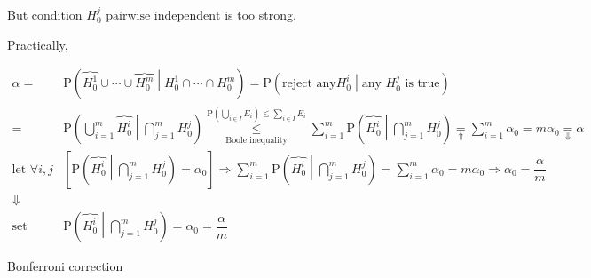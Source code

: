 \documentclass[
]{book}
\theoremstyle{definition}
\theoremstyle{definition}
\theoremstyle{definition}
\theoremstyle{definition}
\theoremstyle{remark}
\begin{document}
But condition \(H_{{\scriptscriptstyle 0}}^{{\scriptscriptstyle j}}\text{ pairwise independent}\) is too strong.

Practically,

\[
\begin{aligned}
\alpha= & \mathrm{P}\left(\overbrace{H_{{\scriptscriptstyle 0}}^{{\scriptscriptstyle 1}}}\cup\cdots\cup\overbrace{H_{{\scriptscriptstyle 0}}^{{\scriptscriptstyle m}}}\middle|H_{{\scriptscriptstyle 0}}^{{\scriptscriptstyle 1}}\cap\cdots\cap H_{{\scriptscriptstyle 0}}^{{\scriptscriptstyle m}}\right)=\mathrm{P}\left(\text{reject any}H_{{\scriptscriptstyle 0}}^{{\scriptscriptstyle i}}\middle|\text{any }H_{{\scriptscriptstyle 0}}^{{\scriptscriptstyle j}}\text{ is true}\right)\\
= & \mathrm{P}\left(\bigcup\limits _{i=1}^{m}\overbrace{H_{{\scriptscriptstyle 0}}^{{\scriptscriptstyle i}}}\middle|\bigcap\limits _{j=1}^{m}H_{{\scriptscriptstyle 0}}^{{\scriptscriptstyle j}}\right)\overset{\mathrm{P}\left(\bigcup\limits _{i\in I}E_{{\scriptscriptstyle i}}\right)\le\sum\limits _{i\in I}E_{{\scriptscriptstyle i}}}{\underset{\text{Boole inequality}}{\le}}\sum\limits _{i=1}^{m}\mathrm{P}\left(\overbrace{H_{{\scriptscriptstyle 0}}^{{\scriptscriptstyle i}}}\middle|\bigcap\limits _{j=1}^{m}H_{{\scriptscriptstyle 0}}^{{\scriptscriptstyle j}}\right)\underset{\Uparrow}{=}\sum\limits _{i=1}^{m}\alpha_{{\scriptscriptstyle 0}}=m\alpha_{{\scriptscriptstyle 0}}\underset{\Downarrow}{=}\alpha\\
\text{let }\forall i,j & \left[\mathrm{P}\left(\overbrace{H_{{\scriptscriptstyle 0}}^{{\scriptscriptstyle i}}}\middle|\bigcap\limits _{j=1}^{m}H_{{\scriptscriptstyle 0}}^{{\scriptscriptstyle j}}\right)=\alpha_{{\scriptscriptstyle 0}}\right]\Rightarrow\sum\limits _{i=1}^{m}\mathrm{P}\left(\overbrace{H_{{\scriptscriptstyle 0}}^{{\scriptscriptstyle i}}}\middle|\bigcap\limits _{j=1}^{m}H_{{\scriptscriptstyle 0}}^{{\scriptscriptstyle j}}\right)=\sum\limits _{i=1}^{m}\alpha_{{\scriptscriptstyle 0}}=m\alpha_{{\scriptscriptstyle 0}}\Rightarrow\alpha_{{\scriptscriptstyle 0}}=\dfrac{\alpha}{m}\\
\Downarrow\\
\text{set } & \mathrm{P}\left(\overbrace{H_{{\scriptscriptstyle 0}}^{{\scriptscriptstyle i}}}\middle|\bigcap\limits _{j=1}^{m}H_{{\scriptscriptstyle 0}}^{{\scriptscriptstyle j}}\right)=\alpha_{{\scriptscriptstyle 0}}=\dfrac{\alpha}{m}
\end{aligned}
\]

Bonferroni correction
\end{document}
